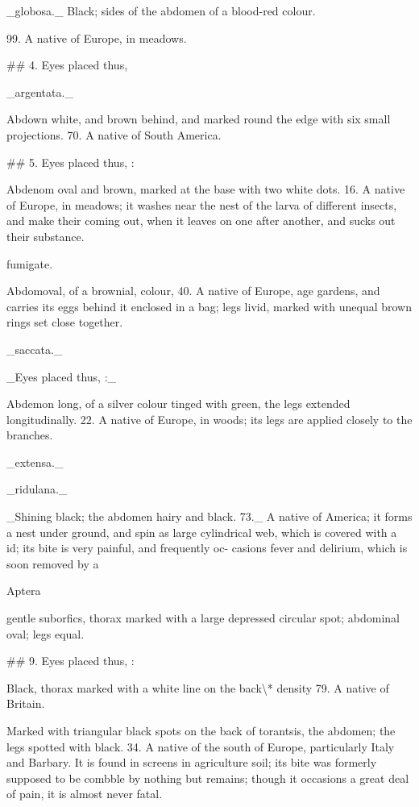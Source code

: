\documentclass{article}
\begin{document}
\_globosa.\_ Black; sides of the abdomen of a blood-red colour.

99. A native of Europe, in meadows.

\#\# 4. Eyes placed thus,

\_argentata.\_

Abdown white, and brown behind, and marked round the edge with six small projections. 70. A native of South America.

\#\# 5. Eyes placed thus, :

Abdenom oval and brown, marked at the base with two white dots. 16. A native of Europe, in meadows; it washes near the nest of the larva of different insects, and make their coming out, when it leaves on one after another, and sucks out their substance.

fumigate.

Abdomoval, of a brownial, colour, 40. A native of Europe, age gardens, and carries its eggs behind it enclosed in a bag; legs livid, marked with unequal brown rings set close together.

\_saccata.\_

\_Eyes placed thus, :\_

Abdemon long, of a silver colour tinged with green, the legs extended longitudinally. 22. A native of Europe, in woods; its legs are applied closely to the branches.

\_extensa.\_

\_ridulana.\_

\_Shining black; the abdomen hairy and black. 73.\_ A native of America; it forms a nest under ground, and spin as large cylindrical web, which is covered with a id; its bite is very painful, and frequently oc- casions fever and delirium, which is soon removed by a

Aptera

gentle suborfics, thorax marked with a large depressed circular spot; abdominal oval; legs equal.

\#\# 9. Eyes placed thus, :

Black, thorax marked with a white line on the back\textbackslash{}* density 79. A native of Britain.

Marked with triangular black spots on the back of torantsis, the abdomen; the legs spotted with black. 34. A native of the south of Europe, particularly Italy and Barbary. It is found in screens in agriculture soil; its bite was formerly supposed to be combble by nothing but remains; though it occasions a great deal of pain, it is almost never fatal.
\end{document}
